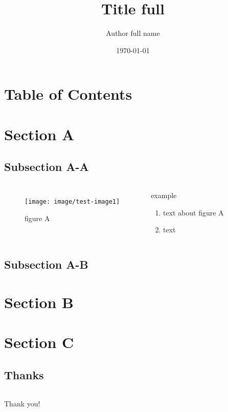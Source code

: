 \documentclass{beamer}
\title[Title short]{Title full}
\author[Author short name]{Author full name}
\institute[institute]{institute full name}
\date{\today}
\begin{document}
\frame{\titlepage}

\section*{Table of Contents}
\frame {
  \frametitle{\secname}
  \tableofcontents
}


\section{Section A}

\subsection{Subsection A-A}

\begin{frame}{\subsecname}
  \begin{columns}
    \begin{figure}
    \texttt{[image: image/test-image1]}
    \caption{figure A}
    \end{figure}
    \begin{block}{example}
      \begin{enumerate}
        \item<alert@1>
        text about figure A
        \item
        text
      \end{enumerate}
    \end{block}
  \end{columns}
\end{frame}

\subsection{Subsection A-B}

\section{Section B}

\section{Section C}

\subsection*{Thanks}

\begin{frame}{\subsecname}
  \begin{columns}
  \column{2.5cm}
  \column{5cm}
    \Huge{Thank you!}
  \column{2.5cm}
  \end{columns}
\end{frame}
\end{document}

